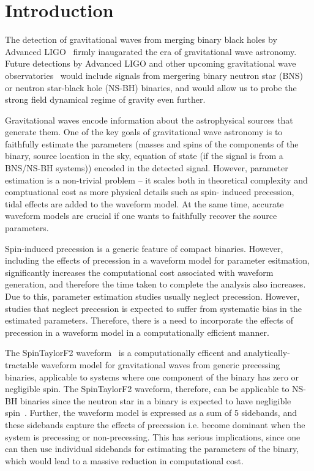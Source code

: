 \chapter{Introduction}

The detection of gravitational waves from merging binary black holes by Advanced LIGO~\cite{Event_0,
Event_2} firmly inaugarated the era of gravitational wave astronomy. Future detections by Advanced
LIGO and other upcoming  gravitational wave observatories~\cite{KAGRA, Virgo, LIGO_india} would
include signals from mergering binary neutron star (BNS) or neutron star-black hole (NS-BH)
binaries, and would allow us to probe the strong field dynamical regime of gravity even further.

Gravitational waves encode information about the astrophysical sources that generate them. One of
the key goals of gravitational  wave astronomy is to faithfully estimate the parameters (masses and
spins of the components of the binary, source location in the sky, equation of state (if the signal
is from a BNS/NS-BH systems)) encoded in the detected signal. However, parameter estimation is a
non-trivial  problem -- it scales both in theoretical complexity and comptuational cost as more
physical details such as spin- induced precession, tidal effects  are added to the waveform model.
At the same time, accurate waveform models are crucial if one wants to faithfully recover the source
parameters.

Spin-induced precession is a generic feature of compact binaries. However, including the effects of
precession in a waveform model for parameter esitmation, significantly increases the computational
cost associated with waveform generation, and therefore the time taken to complete the analysis also
increases. Due to this, parameter estimation studies usually neglect precession. However, studies
that neglect precession is expected to suffer from systematic bias in the estimated parameters.
Therefore, there is a need to incorporate the effects of precession in a waveform model in a
computationally efficient manner.

The SpinTaylorF2 waveform~\cite{Lundgren2014} is a computationally efficent and  analytically-
tractable waveform model for gravitational waves from generic precessing binaries, applicable to
systems where one component of the binary has zero or negligible spin. The SpinTaylorF2 waveform,
therefore, can be applicable to NS-BH binaries since the neutron star in a binary is expected to
have negligible spin~\cite{Lundgren2014}. Further, the waveform model is expressed as a sum of 5
sidebands, and these sidebands capture the effects of precession i.e. become dominant when the
system is precessing or non-precessing. This has serious implications, since one can then use
individual sidebands for estimating the parameters of the binary, which would lead to a massive
reduction in computational cost. 

